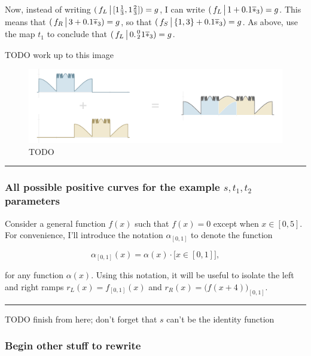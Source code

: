 \documentclass[]{article}
\begin{document}
Now, instead of writing
\((\,f_L \,\big|\, [1\tfrac{1}{3}, 1\tfrac{2}{3}]) = g\), I can write
\((\,f_L \,\big|\, 1 + 0.1\overline{*}_3) = g\). This means that
\((\,f_R \,\big|\, 3 + 0.1\overline{*}_3) = g\), so that
\((\,f_S \,\big|\, \{1,3\} + 0.1\overline{*}_3) = g\). As above, use the
map \(t_1\) to conclude that
\((\,f_L \restrict 0.\zerotwo 1\overline{*}_3) = g\).

TODO work up to this image

\begin{figure}[htbp]
\centering
\includegraphics{images/pdfs/nonplateau.pdf}
\caption{TODO}
\end{figure}

\begin{center}\rule{0.5\linewidth}{\linethickness}\end{center}

\subsubsection{\texorpdfstring{All possible positive curves for the
example \(s,t_1,t_2\)
parameters}{All possible positive curves for the example s,t\_1,t\_2 parameters}}\label{all-possible-positive-curves-for-the-example-stux5f1tux5f2-parameters}

Consider a general function \(f(x)\) such that \(f(x)=0\) except when
\(x \in [0, 5]\). For convenience, I'll introduce the notation
\(\alpha_{[0,1]}\) to denote the function

\[\alpha_{[0,1]}(x) = \alpha(x) \cdot \big[ x\in [0,1] \big],\]

for any function \(\alpha(x)\). Using this notation, it will be useful
to isolate the left and right ramps \(r_L(x) = f_{[0,1]}(x)\) and
\(r_R(x) = \big(f(x + 4)\big)_{[0,1]}\).

\begin{center}\rule{0.5\linewidth}{\linethickness}\end{center}

TODO finish from here; don't forget that \(s\) can't be the identity
function

\subsubsection{Begin other stuff to
rewrite}\label{begin-other-stuff-to-rewrite}
\end{document}
